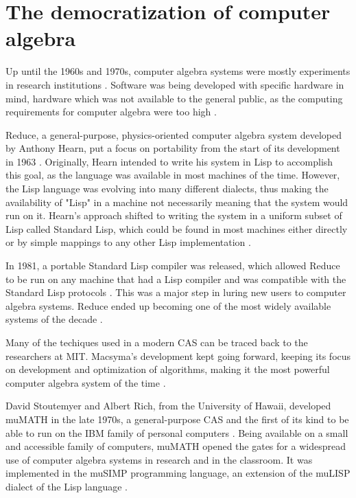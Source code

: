 \section{The democratization of computer algebra}\label{sec:the-democratization-of-computer-algebra}

Up until the 1960s and 1970s, computer algebra systems were mostly experiments in research institutions \parencite{davenport1994computer}. Software was being developed with specific hardware in mind, hardware which was not available to the general public, as the computing requirements for computer algebra were too high \parencite{hearn2005reduce}.

Reduce, a general-purpose, physics-oriented computer algebra system developed by Anthony Hearn, put a focus on portability from the start of its development in 1963 \parencite{hearn2005reduce}. Originally, Hearn intended to write his system in Lisp to accomplish this goal, as the language was available in most machines of the time. However, the Lisp language was evolving into many different dialects, thus making the availability of "Lisp" in a machine not necessarily meaning that the system would run on it. Hearn's approach shifted to writing the system in a uniform subset of Lisp called Standard Lisp, which could be found in most machines either directly or by simple mappings to any other Lisp implementation \parencite{hearn2005reduce}.

In 1981, a portable Standard Lisp compiler was released, which allowed Reduce to be run on any machine that had a Lisp compiler and was compatible with the Standard Lisp protocols \parencite{hearn2005reduce}. This was a major step in luring new users to computer algebra systems. Reduce ended up becoming one of the most widely available systems of the decade \parencite{geddes1992algorithms}.

Many of the techiques used in a modern CAS can be traced back to the researchers at MIT. Macsyma's development kept going forward, keeping its focus on development and optimization of algorithms, making it the most powerful computer algebra system of the time \parencite{geddes1992algorithms}.

David Stoutemyer and Albert Rich, from the University of Hawaii, developed muMATH in the late 1970s, a general-purpose CAS and the first of its kind to be able to run on the IBM family of personal computers \parencite{geddes1992algorithms}. Being available on a small and accessible family of computers, muMATH opened the gates for a widespread use of computer algebra systems in research and in the classroom. It was implemented in the muSIMP programming language, an extension of the muLISP dialect of the Lisp language \parencite{derive-the-roots}.

